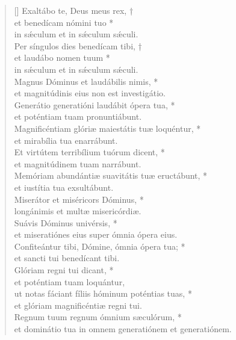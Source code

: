 \begin{verse}[\versewidth]
Exaltábo te, Deus meus rex, †\\
et benedícam nómini tuo *\\
in s\'{æ}culum et in s\'{æ}culum s\'{æ}culi.\\
\vin Per síngulos dies benedícam tibi, †\\
\vin et laudábo nomen tuum *\\
\vin in s\'{æ}culum et in s\'{æ}culum s\'{æ}culi.\\
Magnus Dóminus et laudábilis nimis, *\\
et magnitúdinis eius non est investigátio.\\
\vin Generátio generatióni laudábit ópera tua, *\\
\vin et poténtiam tuam pronuntiábunt.\\
Magnificéntiam glóriæ maiestátis tuæ loquéntur, *\\
et mirabília tua enarrábunt.\\
\vin Et virtútem terribílium tuórum dicent, *\\
\vin et magnitúdinem tuam narrábunt.\\
Memóriam abundántiæ suavitátis tuæ eructábunt, *\\
et iustítia tua exsultábunt.\\
\vin Miserátor et miséricors Dóminus, *\\
\vin longánimis et multæ misericórdiæ.\\
Suávis Dóminus univérsis, *\\
et miseratiónes eius super ómnia ópera eius.\\
\vin Confiteántur tibi, Dómine, ómnia ópera tua; *\\
\vin et sancti tui benedícant tibi.\\
Glóriam regni tui dicant, *\\
et poténtiam tuam loquántur,\\
\vin ut notas fáciant fíliis hóminum poténtias tuas, *\\
\vin et glóriam magnificéntiæ regni tui.\\
Regnum tuum regnum ómnium sæculórum, *\\
et dominátio tua in omnem generatiónem et generatiónem.\\
\end{verse}
\vspace{1cm}




